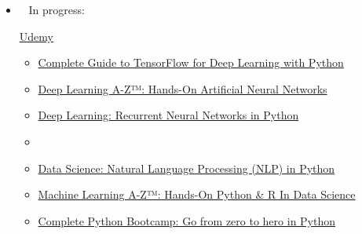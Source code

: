 \begin{itemize}
\begin{multicols}{2}
\begin{itemize}
		\item  {} \href{https://www.coursera.org/learn/introcss}{Introduction to CSS3} 
		
		\item  {} \href{https://www.coursera.org/learn/javascript}{Interactivity with JavaScript}  
		
		\item[]

	\end{itemize}

	\href{http://www.udemy.com}{Udemy}
	\begin{itemize}
		\item  {\large{}} \href{https://www.udemy.com/introduction-to-parallel-programming-using-gpgpu-and-cuda/learn/v4/overview}{Introduction to Parallel Programming using GPGPU and CUDA}
	\end{itemize}
	\end{multicols}

	\item[] \textcolor{red}{\faSpinner} ~ In progress: 
	
	\begin{multicols}{2}
	\href{http://www.udemy.com}{Udemy}
	\begin{itemize}
		\item  \small{} \href{https://www.udemy.com/complete-guide-to-tensorflow-for-deep-learning-with-python/learn/v4/overview}{Complete Guide to TensorFlow for Deep Learning with Python}  
	
	
		\item  {} \href{https://www.udemy.com/deeplearning/learn/v4/overview}{Deep Learning A-Z™: Hands-On Artificial Neural Networks}  	
		
		\item  {} \href{https://www.udemy.com/deep-learning-recurrent-neural-networks-in-python/learn/v4/content}{Deep Learning: Recurrent Neural Networks in Python}  
		
		\item[]
		
		\item  {} \href{https://www.udemy.com/data-science-natural-language-processing-in-python/learn/v4/overview}{Data Science: Natural Language Processing (NLP) in Python}  	
				
				
		\item  {} \href{https://www.udemy.com/machinelearning/learn/v4/overview}{Machine Learning A-Z™: Hands-On Python \& R In Data Science}  	
		
		\item  {} \href{https://www.udemy.com/complete-python-bootcamp/learn/v4/overview}{Complete Python Bootcamp: Go from zero to hero in Python }  	
		
	\end{itemize}
	\end{multicols}

\end{itemize}

